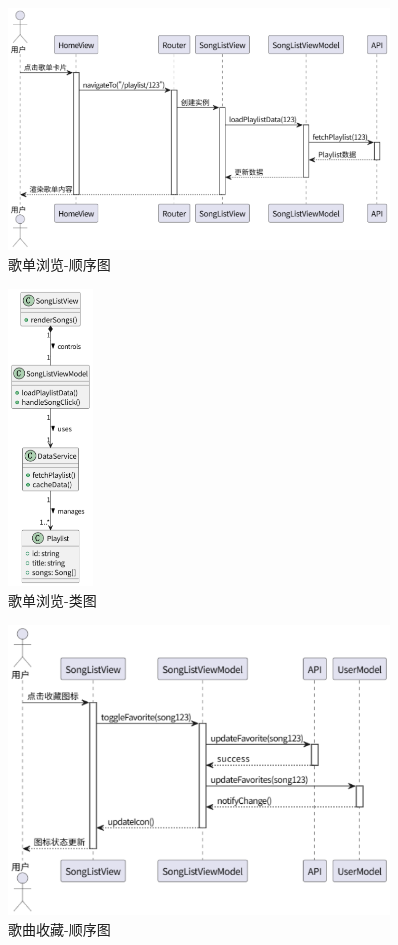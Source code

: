 \documentclass{base}
\numberwithin{figure}{section} %
\begin{document}
\begin{figure}[H]
    \centering
    \includegraphics[width=0.9\textwidth]{images/5-3.png}
    \caption{歌单浏览-顺序图}
\end{figure}
\begin{figure}[H]
    \centering
    \includegraphics[width=0.2\textwidth]{images/5-4.png}
    \caption{歌单浏览-类图}
\end{figure}
\begin{figure}[H]
    \centering
    \includegraphics[width=0.9\textwidth]{images/5-5.png}
    \caption{歌曲收藏-顺序图}
\end{figure}
\end{document}
